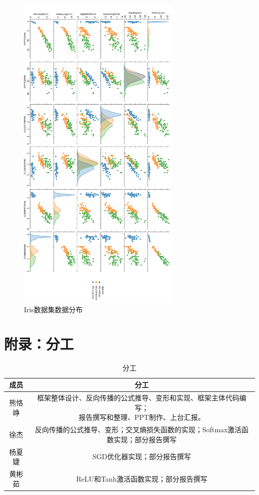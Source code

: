 \documentclass[a4paper,twoside,twocolumn]{article}
\begin{document}
\begin{figure}[H]
	\centering
	\includegraphics[width=0.7\textwidth]{pairplot.png}
	\caption{Iris数据集数据分布}
	\label{fig:iris}
\end{figure}

\clearpage
\section*{附录：分工}

\begin{table}[H]
	\centering
	\caption{分工}
	\label{tbl:assignment}
	\renewcommand\arraystretch{1.5}
	\begin{tabular}{c|c}
		\toprule
		\hline
		成员 & 分工 \\
		\hline
		熊恪峥 & \thead{框架整体设计、反向传播的公式推导、变形和实现、框架主体代码编写；\\ 报告撰写和整理、PPT制作、上台汇报。} \\
		\hline
		徐杰 & 反向传播的公式推导、变形；交叉熵损失函数的实现；Softmax激活函数实现；部分报告撰写\\
		\hline
		杨夏婕 & SGD优化器实现；部分报告撰写\\
		\hline
		黄彬茹 & ReLU和Tanh激活函数实现；部分报告撰写\\
		\hline
		\bottomrule
	\end{tabular}
\end{table}
\end{document}
